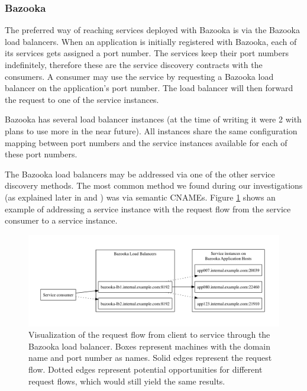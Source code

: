 \subsubsection{Bazooka}
\label{subsubsec:service_disco_bazooka}

The preferred way of reaching services deployed with Bazooka is via the Bazooka load balancers. When an application is initially registered with Bazooka, each of its services gets assigned a port number. The services keep their port numbers indefinitely, therefore these are the service discovery contracts with the consumers. A consumer may use the service by requesting a Bazooka load balancer on the application's port number. The load balancer will then forward the request to one of the service instances.

Bazooka has several load balancer instances (at the time of writing it were 2 with plans to use more in the near future). All instances share the same configuration mapping between port numbers and the service instances available for each of these port numbers.

The Bazooka load balancers may be addressed via one of the other service discovery methods. The most common method we found during our investigations (as explained later in  and ) was via semantic CNAMEs. Figure \ref{fig:bazooka_lb_sd_example} shows an example of addressing a service instance with the request flow from the service consumer to a service instance.

\begin{figure}[h!]
  \centering
  \includegraphics[width=\linewidth] {images/bazooka-lb-service-discovery.pdf}
  \caption{Visualization of the request flow from client to service through the Bazooka load balancer. Boxes represent machines with the domain name and port number as names. Solid edges represent the request flow. Dotted edges represent potential opportunities for different request flows, which would still yield the same results.}
  \label{fig:bazooka_lb_sd_example}
\end{figure}

